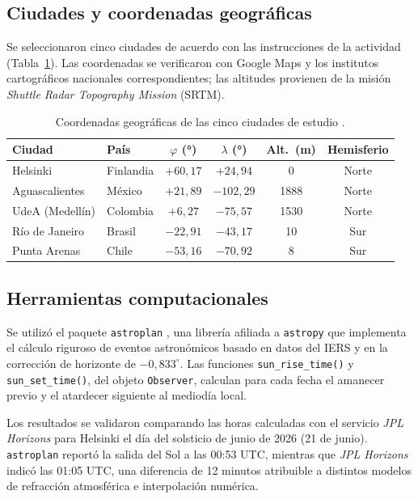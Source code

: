 \subsection{Ciudades y coordenadas geográficas}

Se seleccionaron cinco ciudades de acuerdo con las instrucciones de la actividad
(Tabla~\ref{tab:ciudades}).
Las coordenadas se verificaron con Google Maps \citep{GoogleMaps2026} y los institutos
cartográficos nacionales correspondientes; las altitudes provienen de la misión
\textit{Shuttle Radar Topography Mission} (SRTM).

\begin{table}[H]
  \centering
  \caption{Coordenadas geográficas de las cinco ciudades de estudio
           \citep{GoogleMaps2026}.}
  \label{tab:ciudades}
  \begin{tabular}{llcccc}
    \toprule
    \textbf{Ciudad} & \textbf{País} & \textbf{$\varphi$ (°)} &
    \textbf{$\lambda$ (°)} & \textbf{Alt.\ (m)} & \textbf{Hemisferio} \\
    \midrule
    Helsinki              & Finlandia & $+60{,}17$ & $+24{,}94$ &    0 & Norte \\
    Aguascalientes        & México    & $+21{,}89$ & $-102{,}29$ & 1888 & Norte \\
    UdeA (Medellín)       & Colombia  & $+6{,}27$  & $-75{,}57$  & 1530 & Norte \\
    Río de Janeiro        & Brasil    & $-22{,}91$ & $-43{,}17$  &   10 & Sur   \\
    Punta Arenas          & Chile     & $-53{,}16$ & $-70{,}92$  &    8 & Sur   \\
    \bottomrule
  \end{tabular}
\end{table}

\subsection{Herramientas computacionales}

Se utilizó el paquete \texttt{astroplan} \citep{Morris2018}, una librería afiliada a
\texttt{astropy} que implementa el cálculo riguroso de eventos astronómicos basado en
datos del IERS y en la corrección de horizonte de $-0{,}833^\circ$.
Las funciones \texttt{sun\_rise\_time()} y \texttt{sun\_set\_time()},
del objeto \texttt{Observer}, calculan para cada fecha el amanecer previo
y el atardecer siguiente al mediodía local.

Los resultados se validaron comparando las horas calculadas con el servicio
\textit{JPL Horizons} \citep{Giorgini1996} para Helsinki el día del solsticio de junio
de 2026 (21 de junio).
\texttt{astroplan} reportó la salida del Sol a las 00:53 UTC, mientras que
\textit{JPL Horizons} indicó las 01:05 UTC, una diferencia de 12 minutos atribuible a
distintos modelos de refracción atmosférica e interpolación numérica.

